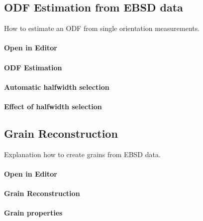 \documentclass{article}
\begin{document}
		\subsection{ODF Estimation from EBSD data}

		
                     \begin{par}
How to estimate an ODF from single orientation measurements.
\end{par} \vspace{1em}

                  
			\paragraph{Open in Editor}
		
			\paragraph{ODF Estimation}
		
			\paragraph{Automatic halfwidth selection}
		
			\paragraph{Effect of halfwidth selection}
		
		\subsection{Grain Reconstruction}

		
                     \begin{par}
Explanation how to create grains from EBSD data.
\end{par} \vspace{1em}

                  
			\paragraph{Open in Editor}
		
			\paragraph{Grain Reconstruction}
		
			\paragraph{Grain properties}
		
\end{document}
